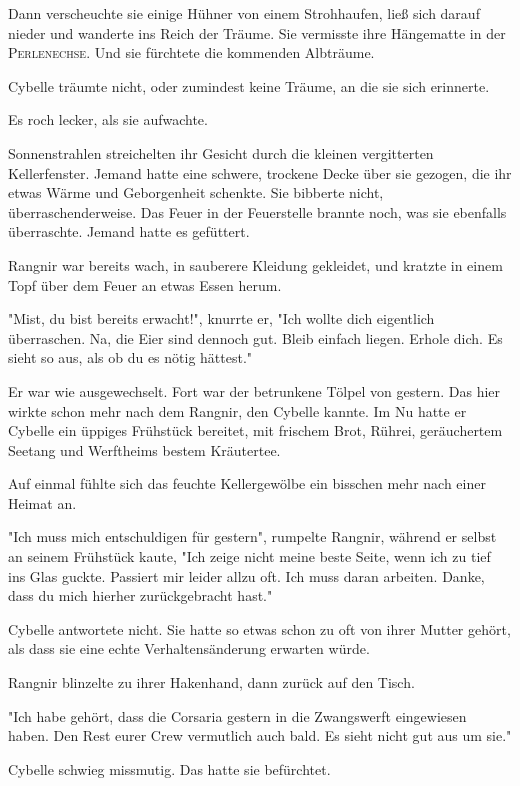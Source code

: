 Dann verscheuchte sie einige Hühner von einem Strohhaufen, ließ sich darauf nieder und wanderte ins Reich der Träume. Sie vermisste ihre Hängematte in der \textsc{Perlenechse}. Und sie fürchtete die kommenden Albträume.

\trennzeichen

Cybelle träumte nicht, oder zumindest keine Träume, an die sie sich erinnerte. 

Es roch lecker, als sie aufwachte.

Sonnenstrahlen streichelten ihr Gesicht durch die kleinen vergitterten Kellerfenster. Jemand hatte eine schwere, trockene Decke über sie gezogen, die ihr etwas Wärme und Geborgenheit schenkte. Sie bibberte nicht, überraschenderweise. Das Feuer in der Feuerstelle brannte noch, was sie ebenfalls überraschte. Jemand hatte es gefüttert.

Rangnir war bereits wach, in sauberere Kleidung gekleidet, und kratzte in einem Topf über dem Feuer an etwas Essen herum.

"Mist, du bist bereits erwacht!", knurrte er, "Ich wollte dich eigentlich überraschen. Na, die Eier sind dennoch gut. Bleib einfach liegen. Erhole dich. Es sieht so aus, als ob du es nötig hättest."

Er war wie ausgewechselt. Fort war der betrunkene Tölpel von gestern. Das hier wirkte schon mehr nach dem Rangnir, den Cybelle kannte. Im Nu hatte er Cybelle ein üppiges Frühstück bereitet, mit frischem Brot, Rührei, geräuchertem Seetang und Werftheims bestem Kräutertee.

Auf einmal fühlte sich das feuchte Kellergewölbe ein bisschen mehr nach einer Heimat an.

"Ich muss mich entschuldigen für gestern", rumpelte Rangnir, während er selbst an seinem Frühstück kaute, "Ich zeige nicht meine beste Seite, wenn ich zu tief ins Glas guckte. Passiert mir leider allzu oft. Ich muss daran arbeiten. Danke, dass du mich hierher zurückgebracht hast."

Cybelle antwortete nicht. Sie hatte so etwas schon zu oft von ihrer Mutter gehört, als dass sie eine echte Verhaltensänderung erwarten würde.

Rangnir blinzelte zu ihrer Hakenhand, dann zurück auf den Tisch.

"Ich habe gehört, dass die  Corsaria gestern in die Zwangswerft eingewiesen haben. Den Rest eurer Crew vermutlich auch bald. Es sieht nicht gut aus um sie."

Cybelle schwieg missmutig. Das hatte sie befürchtet.

